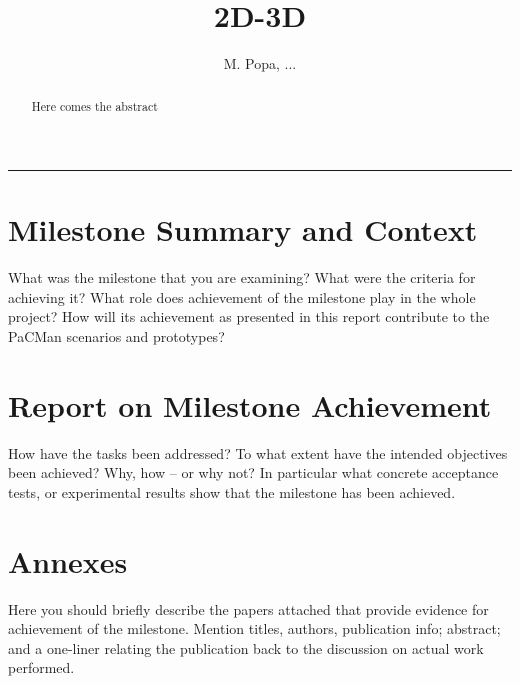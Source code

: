 \documentclass[a4paper,11pt,pdf]{pacmanreport}
\title{2D-3D}
\author{M. Popa, ...}
\begin{document}
\maketitle

\begin{abstract}
\noindent Here comes the abstract
\end{abstract}


\vspace{.2em}
\hrule

\vspace{.2em}
\footnotesize

\tableofcontents

\normalsize

\newpage

\section{Milestone Summary and Context}

What was the milestone that you are examining? What were the criteria for achieving it? What role does achievement of the milestone play in the whole project\cite{ProjectWebsite}? How will its achievement as presented in this report contribute to the PaCMan scenarios and prototypes? 


\newpage

\section{Report on Milestone Achievement}

How have the tasks been addressed? To what extent have the intended objectives been achieved? Why, how -- or why not? In particular what concrete acceptance tests, or experimental results show that the milestone has been achieved.

\newpage



\newpage
\appendix
\section{Annexes}

Here you should briefly describe the papers attached that provide evidence for achievement of the milestone. Mention titles, authors, publication info; abstract; and a one-liner relating the publication back to the discussion on actual work performed. 
\end{document}
